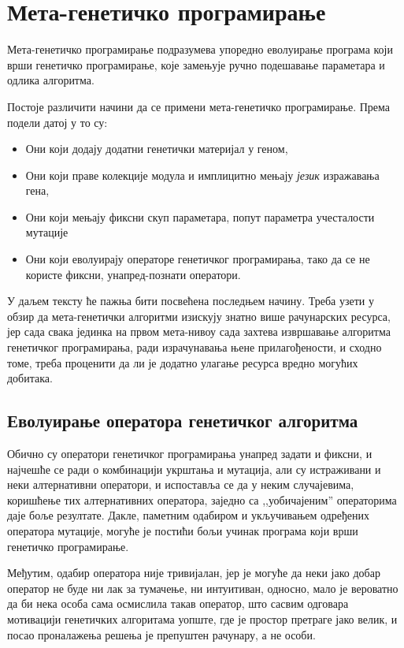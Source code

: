 \documentclass[a4paper]{article}
\begin{document}
\section{Мета-генетичко програмирање}

Мета-генетичко програмирање подразумева упоредно еволуирање програма који врши генетичко програмирање, које замењује ручно подешавање параметара и одлика алгоритма.


Постоје различити начини да се примени мета-генетичко програмирање. Према подели датој у \cite{edmonds2001meta} то су:

\begin{itemize}
	\item Они који додају додатни генетички материјал у геном,
	\item Они који праве колекције модула и имплицитно мењају \emph{језик} изражавања гена,
	\item Они који мењају фиксни скуп параметара, попут параметра учесталости мутације
	\item Они који еволуирају операторе генетичког програмирања, тако да се не користе фиксни, унапред-познати оператори.
\end{itemize}

У даљем тексту ће пажња бити посвећена последњем начину. Треба узети у обзир да мета-генетички алгоритми изискују знатно више рачунарских ресурса, јер сада свака јединка на првом мета-нивоу сада захтева извршавање алгоритма генетичког програмирања, ради израчунавања њене прилагођености, и сходно томе, треба проценити да ли је додатно улагање ресурса вредно могућих добитака.

\subsection{Еволуирање оператора генетичког алгоритма}

Обично су оператори генетичког програмирања унапред задати и фиксни, и најчешће се ради о комбинацији укрштања и мутација, али су истраживани и неки алтернативни оператори, и испоставља се да у неким случајевима, коришћење тих алтернативних оператора, заједно са ,,уобичајеним'' операторима даје боље резултате. Дакле, паметним одабиром и укључивањем одређених оператора мутације, могуће је постићи бољи учинак програма који врши генетичко програмирање.


Међутим, одабир оператора није тривијалан, јер је могуће да неки јако добар оператор не буде ни лак за тумачење, ни интуитиван, односно, мало је вероватно да би нека особа сама осмислила такав оператор, што сасвим одговара мотивацији генетичких алгоритама уопште, где је простор претраге јако велик, и посао проналажења решења је препуштен рачунару, а не особи.
\end{document}
